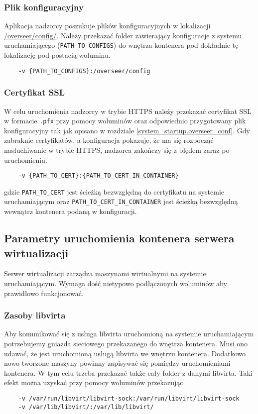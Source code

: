 \documentclass[../opis-rozwiazania.tex]{subfiles}
\begin{document}
\subsubsection{Plik konfiguracyjny}
Aplikacja nadzorcy poszukuje plików konfiguracyjnych w lokalizacji \url{/overseer/config/}.
Należy przekazać folder zawierający konfiguracje z systemu uruchamiającego (\texttt{PATH\_TO\_CONFIGS}) do wnętrza kontenera pod dokładnie tę lokalizację pod postacią woluminu.
\begin{verbatim}
	-v {PATH_TO_CONFIGS}:/overseer/config
\end{verbatim}

\subsubsection{Certyfikat SSL}
W celu uruchomienia nadzorcy w trybie HTTPS należy przekazać certyfikat SSL w formacie \texttt{.pfx} przy pomocy woluminów oraz odpowiednio przygotowany plik konfiguracyjny tak jak opisano w rozdziale \ref{system_startup.overseer_conf}.
Gdy zabraknie certyfikatów, a konfiguracja pokazuje, że ma się rozpocząć nasłuchiwanie w trybie HTTPS, nadzorca zakończy się z błędem zaraz po uruchomieniu.

\begin{verbatim}
	-v {PATH_TO_CERT}:{PATH_TO_CERT_IN_CONTAINER}
\end{verbatim}
gdzie \texttt{PATH\_TO\_CERT} jest ścieżką bezwzględną do certyfikatu na systemie uruchamiającym oraz \texttt{PATH\_TO\_CERT\_IN\_CONTAINER} jest ścieżką bezwzględną wewnątrz kontenera podaną w konfiguracji.

\subsection{Parametry uruchomienia kontenera serwera wirtualizacji}
Serwer wirtualizacji zarządza maszynami wirtualnymi na systemie uruchamiającym.
Wymaga dość nietypowo podłączonych woluminów aby prawidłowo funkcjonować.

\subsubsection{Zasoby libvirta}
Aby komunikować się z usługa libvirta uruchomioną na systemie uruchamiającym potrzebujemy gniazda sieciowego przekazanego do wnętrza kontenera.
Musi ono udawać, że jest uruchomioną usługą libvirta we wnętrzu kontenera.
Dodatkowo nowo tworzone maszyny powinny zapisywać się pomiędzy uruchomieniami kontenera.
W tym celu trzeba przekazać także cały folder z danymi libvirta.
Taki efekt można uzyskać przy pomocy woluminów przekazując
\begin{verbatim}
	-v /var/run/libvirt/libvirt-sock:/var/run/libvirt/libvirt-sock
	-v /var/lib/libvirt/:/var/lib/libvirt/
\end{verbatim}
\end{document}
